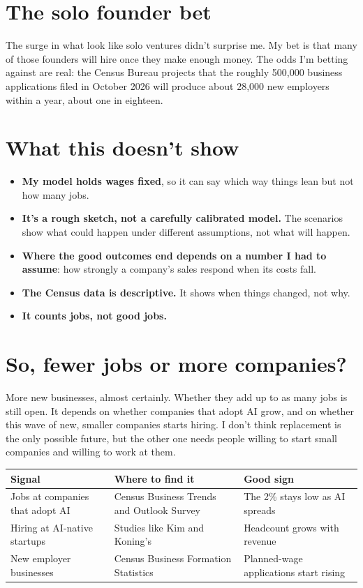 \documentclass[11pt]{article}
\begin{document}
\section*{The solo founder bet}

The surge in what look like solo ventures didn't surprise me. My bet is that many of those founders will hire once they make enough money. The odds I'm betting against are real: the Census Bureau projects that the roughly 500,000 business applications filed in October 2026 will produce about 28,000 new employers within a year, about one in eighteen.

\section*{What this doesn't show}

\begin{itemize}
  \item \textbf{My model holds wages fixed}, so it can say which way things lean but not how many jobs.
  \item \textbf{It's a rough sketch, not a carefully calibrated model.} The scenarios show what could happen under different assumptions, not what will happen.
  \item \textbf{Where the good outcomes end depends on a number I had to assume}: how strongly a company's sales respond when its costs fall.
  \item \textbf{The Census data is descriptive.} It shows when things changed, not why.
  \item \textbf{It counts jobs, not good jobs.}
\end{itemize}

\section*{So, fewer jobs or more companies?}

More new businesses, almost certainly. Whether they add up to as many jobs is still open. It depends on whether companies that adopt AI grow, and on whether this wave of new, smaller companies starts hiring. I don't think replacement is the only possible future, but the other one needs people willing to start small companies and willing to work at them.

\begin{center}
\begin{tabular}{p{4.6cm}p{4.6cm}p{4.2cm}}
\toprule
\textbf{Signal} & \textbf{Where to find it} & \textbf{Good sign} \\
\midrule
Jobs at companies that adopt AI & Census Business Trends and Outlook Survey & The 2\% stays low as AI spreads \\
Hiring at AI-native startups & Studies like Kim and Koning's & Headcount grows with revenue \\
New employer businesses & Census Business Formation Statistics & Planned-wage applications start rising \\
\bottomrule
\end{tabular}
\end{center}
\end{document}
